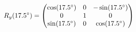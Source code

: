 \documentclass[preview]{standalone}
\begin{document}
\begin{align*}
\special{dvisvgm:raw <g id='unique000'>}R_y(17.5^\circ) = \begin{pmatrix} \cos(17.5^\circ) & 0 & -\sin(17.5^\circ) \\ 0 & 1 & 0 \\ \sin(17.5^\circ) & 0 & \cos(17.5^\circ) \end{pmatrix}\special{dvisvgm:raw </g>}
\end{align*}
\end{document}
